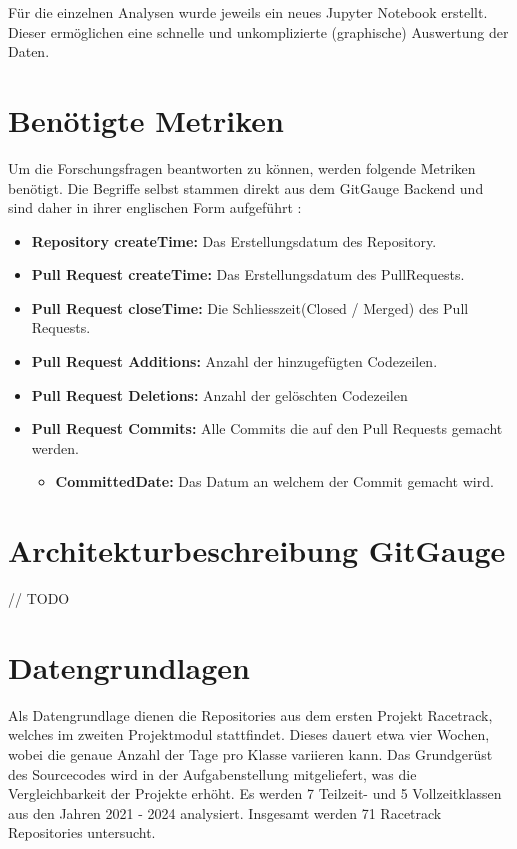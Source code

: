 Für die einzelnen Analysen wurde jeweils ein neues Jupyter Notebook erstellt. Dieser ermöglichen eine schnelle und unkomplizierte (graphische) Auswertung der Daten. \parencite{noauthor_repo-detectivesba-metric-analysis-scripts_nodate}

\section{Benötigte Metriken}
Um die Forschungsfragen beantworten zu können, werden folgende Metriken benötigt. Die Begriffe selbst stammen direkt aus dem GitGauge Backend und sind daher in ihrer englischen Form aufgeführt \parencite{noauthor_repo-detectivesgitgauge-extractor-service_nodate}:
\label{sec:Metriken}
\begin{itemize}
    \item \textbf{Repository createTime:} Das Erstellungsdatum des Repository.
    \item \textbf{Pull Request createTime:} Das Erstellungsdatum des PullRequests.
    \item \textbf{Pull Request closeTime:} Die Schliesszeit(Closed / Merged) des Pull Requests.
    \item \textbf{Pull Request Additions:} Anzahl der hinzugefügten Codezeilen.
    \item \textbf{Pull Request Deletions:} Anzahl der gelöschten Codezeilen
      \item \textbf{Pull Request Commits:} Alle Commits die auf den Pull Requests gemacht werden.
     \begin{itemize}
        \item \textbf{CommittedDate:} Das Datum an welchem der Commit gemacht wird.
    \end{itemize}
\end{itemize}

\section{Architekturbeschreibung GitGauge}
// TODO 

\section{Datengrundlagen}
\label{sec:Datengrundlagen}
Als Datengrundlage dienen die Repositories aus dem ersten Projekt Racetrack, welches im zweiten Projektmodul stattfindet. Dieses dauert etwa vier Wochen, wobei die genaue Anzahl der Tage pro Klasse variieren kann. Das Grundgerüst des Sourcecodes wird in der Aufgabenstellung mitgeliefert, was die Vergleichbarkeit der Projekte erhöht. Es werden 7 Teilzeit- und 5 Vollzeitklassen aus den Jahren 2021 - 2024 analysiert. Insgesamt werden 71 Racetrack Repositories untersucht. 


